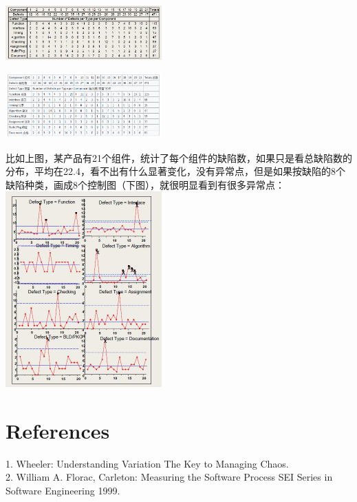 
\includegraphics[width=6cm]{DAD_p65.jpg}


\includegraphics[width=6cm]{Screenshotfrom2022-12-2821-23-27.png}

比如上图，某产品有21个组件，统计了每个组件的缺陷数，如果只是看总缺陷数的分布，平均在22.4，看不出有什么显著变化，没有异常点，但是如果按缺陷的8个缺陷种类，画成8个控制图（下图），就很明显看到有很多异常点：\\

\includegraphics[width=6cm]{DAD_p67.jpg}


\hypertarget{ux9644ux4ef6}{%
\section{References}\label{ux9644ux4ef6}}


1. Wheeler: Understanding Variation The Key to Managing Chaos.\\
2. William A. Florac, Carleton: Measuring the Software Process SEI Series in Software Engineering 1999.\\
